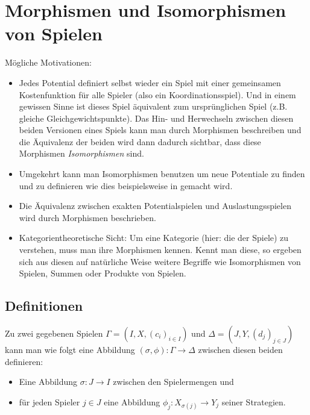 \section[Morphismen]{Morphismen und Isomorphismen von Spielen}\label{sec:Morphismen}


Mögliche Motivationen:
\begin{itemize}
	\item Jedes Potential definiert selbst wieder ein Spiel mit einer gemeinsamen Kostenfunktion für alle Spieler (also ein Koordinationsspiel). Und in einem gewissen Sinne ist dieses Spiel \glqq äquivalent\grqq{} zum ursprünglichen Spiel (z.B. gleiche Gleichgewichtspunkte). Das Hin- und Herwechseln zwischen diesen beiden Versionen eines Spiels kann man durch Morphismen beschreiben und die Äquivalenz der beiden wird dann dadurch sichtbar, dass diese Morphismen \emph{Isomorphismen} sind.
	\item Umgekehrt kann man Isomorphismen benutzen um neue Potentiale zu finden und zu definieren wie dies beispielsweise in \cite[Definitionen 5/6]{BestRespEq} gemacht wird.
	\item Die Äquivalenz zwischen exakten Potentialspielen und Auslastungsspielen wird durch Morphismen beschrieben.
	\item Kategorientheoretische Sicht: Um eine Kategorie (hier: die der Spiele) zu verstehen, muss man ihre Morphismen kennen. Kennt man diese, so ergeben sich aus diesen auf natürliche Weise weitere Begriffe wie Isomorphismen von Spielen, Summen oder Produkte von Spielen.
\end{itemize}


\subsection{Definitionen}

Zu zwei gegebenen Spielen $\Gamma = (I, X, (c_i)_{i\in I})$ und $\Delta = (J, Y, (d_j)_{j\in J})$ kann man wie folgt eine Abbildung $(\sigma, \phi): \Gamma \to \Delta$ zwischen diesen beiden definieren:
\begin{itemize}
	\item Eine Abbildung $\sigma: J \to I$ zwischen den Spielermengen und
	\item für jeden Spieler $j \in J$ eine Abbildung $\phi_j: X_{\sigma(j)} \to Y_j$ seiner Strategien.
\end{itemize}

